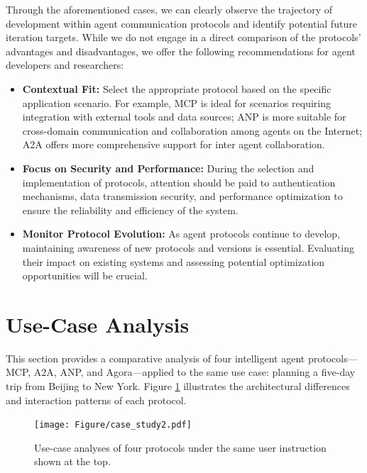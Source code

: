 \documentclass[10pt,preprint]{article}
\begin{document}
Through the aforementioned cases, we can clearly observe the trajectory of development within agent communication protocols and identify potential future iteration targets. While we do not engage in a direct comparison of the protocols' advantages and disadvantages, we offer the following recommendations for agent developers and researchers:
\begin{itemize}
    \item \textbf{Contextual Fit:} Select the appropriate protocol based on the specific application scenario. For example, MCP is ideal for scenarios requiring integration with external tools and data sources; ANP is more suitable for cross-domain communication and collaboration among agents on the Internet; A2A offers more comprehensive support for inter agent collaboration.
    \item \textbf{Focus on Security and Performance:} During the selection and implementation of protocols, attention should be paid to authentication mechanisms, data transmission security, and performance optimization to ensure the reliability and efficiency of the system.
    \item \textbf{Monitor Protocol Evolution:} As agent protocols continue to develop, maintaining awareness of new protocols and versions is essential. Evaluating their impact on existing systems and assessing potential optimization opportunities will be crucial.
\end{itemize}


\section{Use-Case Analysis}
This section provides a comparative analysis of four intelligent agent protocols—MCP, A2A, ANP, and Agora—applied to the same use case: planning a five-day trip from Beijing to New York. Figure \ref{fig:use-case-analysis} illustrates the architectural differences and interaction patterns of each protocol.

\begin{figure}[t]
    \centering
    \texttt{[image: Figure/case\_study2.pdf]}
    \caption{Use-case analyses of four protocols under the same user instruction shown at the top.}
    \label{fig:use-case-analysis}
\end{figure}
\end{document}
